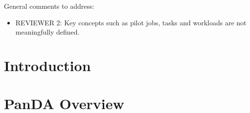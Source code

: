 \documentclass[conference]{IEEEtran}
\begin{document}
\ifreview
General comments to address:
\begin{itemize}
    \color{red} 
    \item REVIEWER 2:  Key concepts such as pilot jobs, tasks and workloads
    are not meaningfully defined.
\end{itemize}
\fi

\begin{abstract}

\end{abstract}


\section{Introduction}\label{sec:intro}



\section{PanDA Overview}\label{sec:panda_overview}

\end{document}
